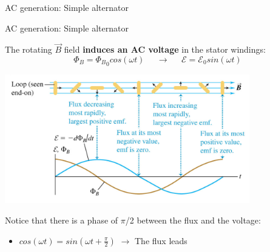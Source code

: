 \begin{frame}{AC generation: Simple alternator}
\end{frame}


%
%
%

\begin{frame}{AC generation: Simple alternator}

The rotating $\vec{B}$ field {\bf induces an AC voltage} in the stator windings:
\begin{equation*}
     \Phi_B = {\Phi_B}_{0}  cos(\omega t) \;\;\;\;\; \rightarrow \;\;\;\;\; \mathcal{E} = \mathcal{E}_0 sin(\omega t)
\end{equation*}

\begin{center}
    \includegraphics[width=0.80\textwidth]{./images/schematics/simple_alternator_operation.png}\\
\end{center}

Notice that there is a phase of $\pi$/2 between the flux and the voltage:
\begin{itemize}
   \item $\displaystyle cos(\omega t) = sin(\omega t + \frac{\pi}{2})$ $\rightarrow$ The flux leads
\end{itemize}


\end{frame}

%
%
%


